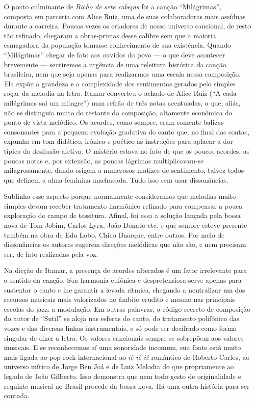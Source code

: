 O ponto culminante de \textit{Bicho de sete cabeças} foi a canção ``Milágrimas'', composta em parceria com Alice Ruiz, uma de suas colaboradoras mais
assíduas durante a carreira. Poucas vezes os criadores de nosso universo
cancional, de resto tão refinado, chegaram a obras-primas desse calibre
sem que a maioria esmagadora da população tomasse conhecimento de sua
existência. Quando ``Milágrimas'' chegar de fato aos ouvidos do povo --- o que
deve acontecer brevemente --- sentiremos a urgência de uma releitura
histórica da canção brasileira, nem que seja apenas para realizarmos uma
escala nessa composição. Ela expõe a grandeza e a complexidade dos
sentimentos gerados pelo simples roçar da melodia na letra. Itamar
converteu o achado de Alice Ruiz (``A cada milágrimas sai um milagre'')
num refrão de três notas acentuadas, o que, aliás, não se distinguia
muito do restante da composição, altamente econômica do ponto de vista
melódico. Os acordes, como sempre, eram somente balizas consonantes para
a pequena evolução gradativa do canto que, no final das contas, expunha
em tom didático, irônico e poético as instruções para aplacar a dor
típica da desilusão afetiva. O mistério estava no fato de que os poucos
acordes, as poucas notas e, por extensão, as poucas lágrimas
multiplicavam-se milagrosamente, dando origem a numerosos matizes de
sentimento, talvez todos que definem a alma feminina machucada. Tudo
isso sem usar dissonâncias.

Sublinho esse aspecto porque normalmente consideramos que melodias muito
simples devam receber tratamento harmônico refinado para compensar a
pouca exploração do campo de tessitura. Afinal, foi essa a solução
lançada pela bossa nova de Tom Jobim, Carlos Lyra, João Donato etc. e
que sempre esteve presente também na obra de Edu Lobo, Chico Buarque,
entre outros. Por meio de dissonâncias os autores sugerem direções
melódicas que não são, e nem precisam ser, de fato realizadas pela voz.

Na dicção de Itamar, a presença de acordes alterados é um fator
irrelevante para o sentido da canção. Sua harmonia eufônica e
despretensiosa serve apenas para sustentar o canto e lhe garantir a
levada rítmica, chegando a neutralizar um dos recursos musicais mais
valorizados no âmbito erudito e mesmo nas principais escolas do jazz: a
modulação. Em outras palavras, o código secreto de composição do autor
de ``Sutil'' se aloja nas esferas do canto, do tratamento polifônico das
vozes e das diversas linhas instrumentais, e só pode ser decifrado como
forma singular de dizer a letra. Os valores cancionais sempre se
sobrepõem aos valores musicais. E se reconhecemos aí uma sonoridade
incomum, sua fonte está muito mais ligada ao pop-rock internacional ao
\textit{iê-iê-iê} romântico de Roberto Carlos, ao universo mítico de Jorge Ben
Joá e de Luiz Melodia do que propriamente ao legado de João Gilberto.
Isso demonstra que nem todo gesto de originalidade e requinte musical
no Brasil procede da bossa nova. Há uma outra história para ser contada.

